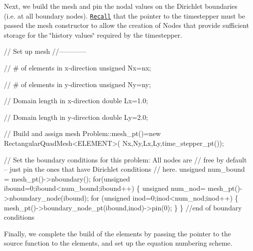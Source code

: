 Next, we build the mesh and pin the nodal values on the Dirichlet boundaries (i.\+e. at all boundary nodes). \href{../../../unsteady_heat/two_d_unsteady_heat/html/index.html}{\tt Recall} that the pointer to the timestepper must be passed the mesh constructor to allow the creation of {\ttfamily Nodes} that provide sufficient storage for the \char`\"{}history values\char`\"{} required by the timestepper.


\begin{DoxyCodeInclude}

 \textcolor{comment}{// Set up mesh}
 \textcolor{comment}{//------------}

 \textcolor{comment}{// # of elements in x-direction}
 \textcolor{keywordtype}{unsigned} Nx=nx;

 \textcolor{comment}{// # of elements in y-direction}
 \textcolor{keywordtype}{unsigned} Ny=ny;

 \textcolor{comment}{// Domain length in x-direction}
 \textcolor{keywordtype}{double} Lx=1.0;

 \textcolor{comment}{// Domain length in y-direction}
 \textcolor{keywordtype}{double} Ly=2.0;

 \textcolor{comment}{// Build and assign mesh}
 Problem::mesh\_pt()=\textcolor{keyword}{new} RectangularQuadMesh<ELEMENT>(
  Nx,Ny,Lx,Ly,time\_stepper\_pt());

 \textcolor{comment}{// Set the boundary conditions for this problem: All nodes are}
 \textcolor{comment}{// free by default -- just pin the ones that have Dirichlet conditions}
 \textcolor{comment}{// here. }
 \textcolor{keywordtype}{unsigned} num\_bound = mesh\_pt()->nboundary();
 \textcolor{keywordflow}{for}(\textcolor{keywordtype}{unsigned} ibound=0;ibound<num\_bound;ibound++)
  \{
   \textcolor{keywordtype}{unsigned} num\_nod= mesh\_pt()->nboundary\_node(ibound);
   \textcolor{keywordflow}{for} (\textcolor{keywordtype}{unsigned} inod=0;inod<num\_nod;inod++)
    \{
     mesh\_pt()->boundary\_node\_pt(ibound,inod)->pin(0); 
    \}
  \} \textcolor{comment}{//end of boundary conditions}

\end{DoxyCodeInclude}


Finally, we complete the build of the elements by passing the pointer to the source function to the elements, and set up the equation numbering scheme.


